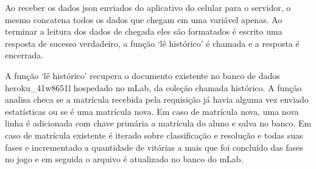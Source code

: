 Ao receber os dados json enviados do aplicativo do celular para o servidor, o mesmo concatena todos os dados que chegam em uma variável apenas. Ao terminar a leitura dos dados de chegada eles são formatados é escrito uma resposta de sucesso verdadeiro, a função ‘lê histórico’ é chamada e a resposta é encerrada.

A função ‘lê histórico’ recupera o documento existente no banco de dados heroku\_41w8651l hospedado no mLab, da coleção chamada histórico. A função analisa checa se a matrícula recebida pela requisição já havia alguma vez enviado estatísticas ou se é uma matrícula nova. Em caso de matrícula nova, uma nova linha é adicionada com chave primária a matrícula do aluno e salva no banco. Em caso de matrícula existente é iterado sobre classificação e resolução e todas suas fases e incrementado a quantidade de vitórias a mais que foi concluído das fases no jogo e em seguida o arquivo é atualizado no banco do mLab.


